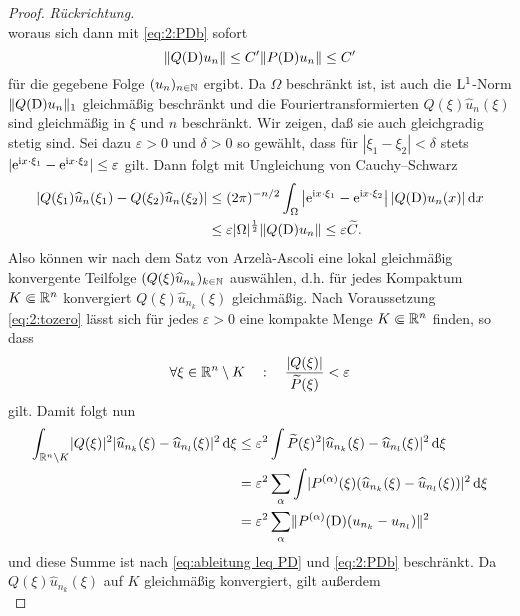 \begin{proof} {\it Rückrichtung.}
\begin{equation}
\end{equation}
woraus sich dann mit \eqref{eq:2:PDb} sofort
\begin{equation}
\lVert Q(\mathrm D)u_n\rVert\leq C' \lVert P(\mathrm D)u_n\rVert \leq C' 
\end{equation}
für die gegebene Folge $(u_n)_{n\in\mathbb N}$ ergibt. Da $\Omega$ beschränkt ist, ist auch die $\mathrm L^1$-Norm $\|Q(\mathrm D)u_n\|_1$ gleichmäßig beschränkt und die 
Fouriertransformierten $Q(\xi) \widehat{u}_n(\xi)$ sind gleichmäßig in $\xi$ und $n$ beschränkt. Wir zeigen, daß sie auch gleichgradig stetig sind. Sei dazu $\varepsilon>0$ und $\delta>0$ so gewählt, dass für $|\xi_1 - \xi_2| < \delta$ stets $|\mathrm e^{\mathrm i x \cdot \xi_1} - \mathrm e^{\mathrm i x \cdot \xi_2}|\le\varepsilon$ gilt. Dann folgt mit Ungleichung von Cauchy--Schwarz 
\begin{align}
| Q(\xi_1)\widehat{u}_n(\xi_1) - Q(\xi_2)\widehat{u}_n(\xi_2)| & \leq (2\pi)^{-n/2} \int_{\Omega} \left| \mathrm e^{\mathrm i x \cdot \xi_1} - \mathrm e^{\mathrm i x \cdot \xi_2} \right| | Q(\mathrm D) u_n(x)| \,\mathrm d x \notag
\\ & \leq \varepsilon |\Omega|^{\frac{1}{2}} \Vert Q(\mathrm D)u_n \Vert \leq \varepsilon \widetilde{C}.
\end{align}
Also können wir nach dem Satz von Arzel\`a-Ascoli eine lokal gleichmäßig konvergente Teilfolge $(Q(\xi)\widehat{u}_{n_k})_{k\in\mathbb N}$ auswählen, d.h. für jedes Kompaktum $K\Subset\mathbb R^n$ konvergiert $Q(\xi)\widehat{u}_{n_k}(\xi)$ gleichmäßig.
Nach Voraussetzung \eqref{eq:2:tozero} lässt sich für jedes $\varepsilon > 0$ eine kompakte Menge $K \Subset \mathbb R^n$ finden, so dass 
\begin{equation}
\forall \xi\in\mathbb R^n\setminus K \quad:\quad \frac{\lvert Q(\xi)\rvert}{\widetilde{P}(\xi)} <\varepsilon
\end{equation}
gilt. Damit folgt nun
\begin{align}
\int_{\mathbb R^n\setminus K}\lvert Q(\xi)\rvert^2\lvert\widehat{u}_{n_k}(\xi)-\widehat{u}_{n_l}(\xi)\rvert^2\,\mathrm d \xi
&\leq\varepsilon^2\int\widetilde{P}(\xi)^2\lvert\widehat{u}_{n_k}(\xi)-\widehat{u}_{n_l}(\xi)\rvert^2\,\mathrm d \xi\notag\\
&=\varepsilon^2\sum_\alpha \int  \lvert P^{(\alpha)}(\xi) (\widehat{u}_{n_k}(\xi)-\widehat{u}_{n_l}(\xi) ) \rvert^2\,\mathrm d \xi\notag\\
&=\varepsilon^2\sum_\alpha \lVert P^{(\alpha)}(\mathrm D)(u_{n_k}-u_{n_l})\rVert^2\label{eq:2:Kcsum}
\end{align}
und diese Summe ist nach \eqref{eq:ableitung leq PD} und \eqref{eq:2:PDb} beschränkt.
Da $Q(\xi)\widehat u_{n_k}(\xi)$ auf $K$ gleichmäßig konvergiert, gilt außerdem
\begin{equation}

\end{equation}
\end{proof}

